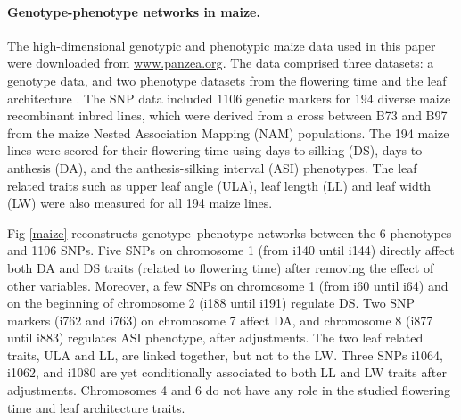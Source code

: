 \paragraph{Genotype-phenotype networks in maize.} The high-dimensional genotypic and phenotypic maize data used in this paper were downloaded from \url{www.panzea.org}. The data comprised three datasets: a genotype data, and two phenotype datasets from the flowering time \citep{buckler2009genetic} and the leaf architecture \citep{tian2011genome}. The SNP data included $1106$ genetic markers for $194$ diverse maize recombinant inbred lines, which were derived from a cross between B73 and B97 from the maize Nested Association Mapping (NAM) populations. The 194 maize lines were scored for their flowering time using days to silking (DS), days to anthesis (DA), and the anthesis-silking interval (ASI) phenotypes. The leaf related traits such as upper leaf angle (ULA), leaf length (LL) and leaf width (LW) were also measured for all 194 maize lines.

Fig \ref{maize} reconstructs genotype--phenotype networks between the 6 phenotypes and 1106 SNPs. Five SNPs on chromosome 1 (from i140 until i144) directly affect both DA and DS traits (related to flowering time) after removing the effect of other variables.   %
Moreover, a few SNPs on chromosome 1 (from i60 until i64) and on the beginning of chromosome 2 (i188 until i191) regulate DS.
Two SNP markers (i762 and i763) on chromosome 7 affect DA, and chromosome 8 (i877 until i883) regulates ASI phenotype, after adjustments.
The two leaf related traits, ULA and LL, are linked together, but not to the LW. Three SNPs i1064, i1062, and i1080 are yet conditionally associated to both LL and LW traits after adjustments.
Chromosomes 4 and 6 do not have any role in the studied flowering time and leaf architecture traits.

